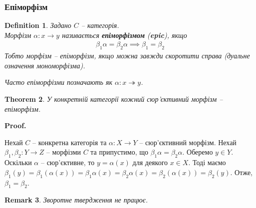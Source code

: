 \documentclass[a4paper, 10pt]{article}
\makeatletter
\theoremstyle{theoremdd}
\newtheorem{theorem}{Theorem}[subsection]
\newtheorem{definition}[theorem]{Definition}
\newtheorem{remark}[theorem]{Remark}
\renewenvironment{proof}[1][Proof.\\]{\par
\pushQED{\hfill \qed}%
\normalfont \topsep6\p@\@plus6\p@\relax
\trivlist
\item\relax
{\bfseries
#1\@addpunct{.}}\hspace\labelsep\ignorespaces
}{%
\popQED\endtrivlist\@endpefalse
}
\makeatother
\begin{document}
\subsubsection{Епіморфізм}
\begin{definition}
Задано $C$ -- категорія.\\
Морфізм $\alpha \colon x \to y$ називається \textbf{епіморфізмом} (\textbf{epic}), якщо
\begin{align*}
\beta_1 \alpha = \beta_2 \alpha \implies \beta_1 = \beta_2
\end{align*}
Тобто морфізм -- епіморфізм, якщо можна завжди скоротити справа (дуальне означення мономорфізма).
\begin{figure}[H]
\centering
{}
\end{figure}
\noindent
Часто епіморфізми позначають як $\alpha \colon x \twoheadrightarrow y$.
\end{definition}

\begin{theorem}
У конкретній категорії кожний сюр'єктивний морфізм -- епіморфізм.
\end{theorem}

\begin{proof}
Нехай $C$ -- конкретна категорія та $\alpha \colon X \to Y$ -- сюр'єктивний морфізм. Нехай $\beta_1,\beta_2 \colon Y \to Z$ -- морфізми $C$ та припустимо, що $\beta_1 \alpha = \beta_2 \alpha$. Оберемо $y \in Y$. Оскільки $\alpha$ -- сюр'єктивне, то $y = \alpha(x)$ для деякого $x \in X$. Тоді маємо $\beta_1(y) = \beta_1(\alpha(x)) = \beta_1 \alpha(x) = \beta_2 \alpha(x) = \beta_2(\alpha(x)) = \beta_2(y)$. Отже, $\beta_1 = \beta_2$.
\end{proof}

\begin{remark}
Зворотне твердження не працює.
\end{remark}
\end{document}
